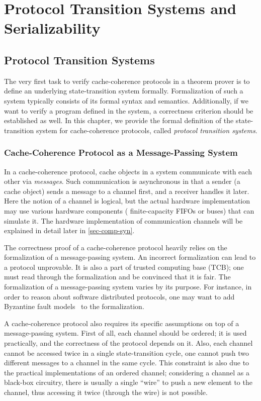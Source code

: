 \part{Protocol Transition Systems and Serializability}

\chapter{Protocol Transition Systems}
\label{sec-trs}

The very first task to verify cache-coherence protocols in a theorem prover is to define an underlying state-transition system formally.
Formalization of such a system typically consists of its formal syntax and semantics.
Additionally, if we want to verify a program defined in the system, a correctness criterion should be established as well.
In this chapter, we provide the formal definition of the state-transition system for cache-coherence protocols, called \emph{protocol transition systems}.

\section{Cache-Coherence Protocol as a Message-Passing System}
\label{sec-cc-as-mp}

In a cache-coherence protocol, cache objects in a system communicate with each other via \emph{messages}.
Such communication is asynchronous in that a sender (a cache object) sends a message to a channel first, and a receiver handles it later.
Here the notion of a channel is logical, but the actual hardware implementation may use various hardware components (\eg{} finite-capacity FIFOs or buses) that can simulate it.
The hardware implementation of communication channels will be explained in detail later in \autoref{sec-comp-syn}.

The correctness proof of a cache-coherence protocol heavily relies on the formalization of a message-passing system.
An incorrect formalization can lead to a protocol unprovable.
It is also a part of trusted computing base (TCB); one must read through the formalization and be convinced that it is fair.
The formalization of a message-passing system varies by its purpose.
For instance, in order to reason about software distributed protocols, one may want to add Byzantine fault models~\cite{byzantine} to the formalization.

A cache-coherence protocol also requires its specific assumptions on top of a message-passing system.
First of all, each channel should be ordered; it is used practically, and the correctness of the protocol depends on it.
Also, each channel cannot be accessed twice in a single state-transition cycle, \eg{} one cannot push two different messages to a channel in the same cycle.
This constraint is also due to the practical implementations of an ordered channel; considering a channel as a black-box circuitry, there is usually a single ``wire'' to push a new element to the channel, thus accessing it twice (through the wire) is not possible.

